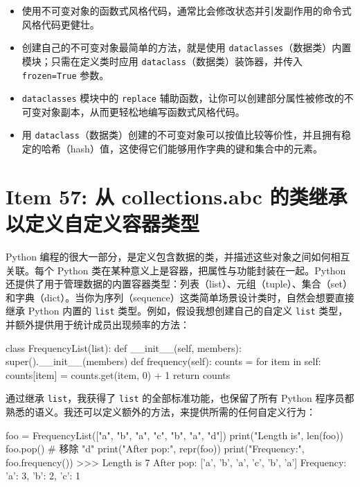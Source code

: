 \begin{itemize}
\item 使用不可变对象的函数式风格代码，通常比会修改状态并引发副作用的命令式风格代码更健壮。
\item 创建自己的不可变对象最简单的方法，就是使用 \texttt{dataclasses}（数据类）内置模块；只需在定义类时应用 \texttt{dataclass}（数据类）装饰器，并传入 \texttt{frozen=True} 参数。
\item \texttt{dataclasses} 模块中的 \texttt{replace} 辅助函数，让你可以创建部分属性被修改的不可变对象副本，从而更轻松地编写函数式风格代码。
\item 用 \texttt{dataclass}（数据类）创建的不可变对象可以按值比较等价性，并且拥有稳定的哈希（hash）值，这使得它们能够用作字典的键和集合中的元素。
\end{itemize}

\section{Item 57: 从 collections.abc 的类继承以定义自定义容器类型}

Python 编程的很大一部分，是定义包含数据的类，并描述这些对象之间如何相互关联。每个 Python 类在某种意义上是容器，把属性与功能封装在一起。Python 还提供了用于管理数据的内置容器类型：列表（list）、元组（tuple）、集合（set）和字典（dict）。当你为序列（sequence）这类简单场景设计类时，自然会想要直接继承 Python 内置的 \texttt{list} 类型。例如，假设我想创建自己的自定义 \texttt{list} 类型，并额外提供用于统计成员出现频率的方法：

\begin{codebox}[python]
class FrequencyList(list):
    def __init__(self, members):
        super().__init__(members)
    def frequency(self):
        counts = {}
        for item in self:
            counts[item] = counts.get(item, 0) + 1
        return counts
\end{codebox}

通过继承 \texttt{list}，我获得了 \texttt{list} 的全部标准功能，也保留了所有 Python 程序员都熟悉的语义。我还可以定义额外的方法，来提供所需的任何自定义行为：

\begin{codebox}[python]
foo = FrequencyList(["a", "b", "a", "c", "b", "a", "d"])
print("Length is", len(foo))
foo.pop()  # 移除 "d"
print("After pop:", repr(foo))
print("Frequency:", foo.frequency())
>>>
Length is 7
After pop: ['a', 'b', 'a', 'c', 'b', 'a']
Frequency: {'a': 3, 'b': 2, 'c': 1}
\end{codebox}

